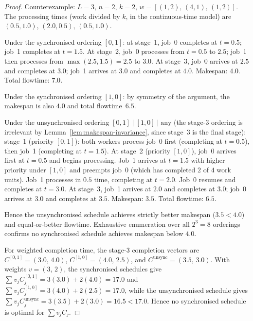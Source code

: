 \documentclass[11pt,titlepage]{article}
\begin{document}
\begin{proof}
Counterexample: $L = 3$, $n = 2$, $k = 2$,
$w = [(1,2),\,(4,1),\,(1,2)]$. The processing times (work
divided by $k$, in the continuous-time model) are
$(0.5, 1.0)$, $(2.0, 0.5)$, $(0.5, 1.0)$.

Under the synchronised ordering $[0,1]$: at stage~1,
job~0 completes at $t = 0.5$; job~1 completes at
$t = 1.5$. At stage~2, job~0 processes from $t = 0.5$ to
$2.5$; job~1 then processes from $\max(2.5, 1.5) = 2.5$
to $3.0$. At stage~3, job~0 arrives at $2.5$ and completes
at $3.0$; job~1 arrives at $3.0$ and completes at $4.0$.
Makespan: $4.0$. Total flowtime: $7.0$.

Under the synchronised ordering $[1,0]$: by symmetry of
the argument, the makespan is also $4.0$ and total
flowtime~$6.5$.

Under the unsynchronised ordering
$[0,1] \mid [1,0] \mid \text{any}$ (the stage-3 ordering
is irrelevant by Lemma~\ref{lem:makespan-invariance}, since
stage~3 is the final stage): stage~1 (priority $[0,1]$): both workers process job~0
first (completing at $t = 0.5$), then job~1 (completing
at $t = 1.5$). At stage~2 (priority $[1,0]$), job~0 arrives
first at $t = 0.5$ and begins processing. Job~1 arrives at
$t = 1.5$ with higher priority under $[1,0]$ and preempts
job~0 (which has completed $2$ of $4$ work units). Job~1
processes in $0.5$ time, completing at $t = 2.0$. Job~0
resumes and completes at $t = 3.0$. At stage~3, job~1
arrives at $2.0$ and completes at $3.0$; job~0 arrives at
$3.0$ and completes at $3.5$. Makespan: $3.5$. Total flowtime: $6.5$.

Hence the unsynchronised schedule achieves strictly better
makespan ($3.5 < 4.0$) and equal-or-better flowtime.
Exhaustive enumeration over all $2^3 = 8$ orderings
confirms no synchronised schedule achieves makespan below
$4.0$.

For weighted completion time, the stage-3 completion vectors are
$C^{[0,1]} = (3.0,\, 4.0)$, $C^{[1,0]} = (4.0,\, 2.5)$, and
$C^{\text{unsync}} = (3.5,\, 3.0)$.
With weights $v = (3,\, 2)$, the synchronised schedules give
$\sum v_j C_j^{[0,1]} = 3(3.0) + 2(4.0) = 17.0$ and
$\sum v_j C_j^{[1,0]} = 3(4.0) + 2(2.5) = 17.0$,
while the unsynchronised schedule gives
$\sum v_j C_j^{\text{unsync}} = 3(3.5) + 2(3.0) = 16.5 < 17.0$.
Hence no synchronised schedule is optimal for $\sum v_j C_j$.
\end{proof}
\end{document}
